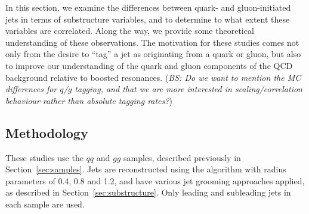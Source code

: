 In this section, we examine the differences between quark- and gluon-initiated jets in terms of substructure variables, and to determine to what extent these variables are correlated. Along the way, we provide some theoretical understanding of these observations. The motivation for these studies comes not only from the desire to ``tag'' a jet as originating from a quark or gluon, but also to improve our  understanding of the quark and gluon components of the QCD background relative to boosted resonances.  (\emph{BS: Do we want to mention the MC differences for $q$/$g$ tagging, and that we are more interested in scaling/correlation behaviour rather than absolute tagging rates?})

\subsection{Methodology}

These studies use the $qq$ and $gg$ samples, described previously in Section~\ref{sec:samples}.
Jets are reconstructed using the \antikt algorithm with 
radius parameters of 0.4, 0.8 and 1.2, and have various
jet grooming approaches applied, as described in Section~\ref{sec:substructure}. 
Only leading and subleading jets in each sample are used. 

